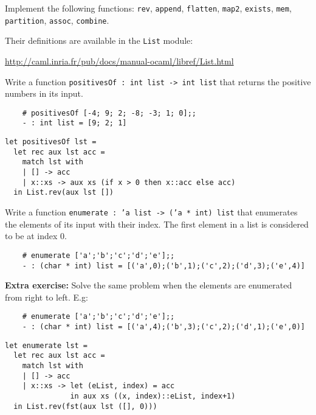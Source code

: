 \documentclass[addpoints]{exam}
\begin{document}
\begin{questions}
  \question 
  Implement the following functions:
  \texttt{rev}, \texttt{append}, \texttt{flatten},
  \texttt{map2}, \texttt{exists}, \texttt{mem},
  \texttt{partition}, \texttt{assoc}, \texttt{combine}.

  
  Their definitions are available in the \texttt{List} module:

  \url{http://caml.inria.fr/pub/docs/manual-ocaml/libref/List.html}


  \vspace{1em}

  \question
  Write a function \texttt{positivesOf : int list -> int list}
  that returns the positive numbers in its input.
  \begin{verbatim}
    # positivesOf [-4; 9; 2; -8; -3; 1; 0];;
    - : int list = [9; 2; 1]
  \end{verbatim}

  \begin{solutionbox}{4cm}
    \begin{verbatim}
let positivesOf lst =
  let rec aux lst acc =
    match lst with
    | [] -> acc
    | x::xs -> aux xs (if x > 0 then x::acc else acc)
  in List.rev(aux lst [])
    \end{verbatim}
  \end{solutionbox}

  
  \question
  Write a function 
  \texttt{enumerate : 'a list -> ('a * int) list} 
  that enumerates the elements of its input with their index.
  The first element in a list is considered to be at index 0.
  \begin{verbatim}
    # enumerate ['a';'b';'c';'d';'e'];;
    - : (char * int) list = [('a',0);('b',1);('c',2);('d',3);('e',4)]
  \end{verbatim}
  \textbf{Extra exercise:} Solve the same problem when the elements are 
  enumerated from right to left. E.g:
  \begin{verbatim}
    # enumerate ['a';'b';'c';'d';'e'];;
    - : (char * int) list = [('a',4);('b',3);('c',2);('d',1);('e',0)]
  \end{verbatim}

  \begin{solutionbox}{4.5cm}
    \begin{verbatim}
let enumerate lst =
  let rec aux lst acc =
    match lst with
    | [] -> acc
    | x::xs -> let (eList, index) = acc
               in aux xs ((x, index)::eList, index+1)
  in List.rev(fst(aux lst ([], 0)))
    \end{verbatim}
  \end{solutionbox}

  
\end{questions}
\end{document}
